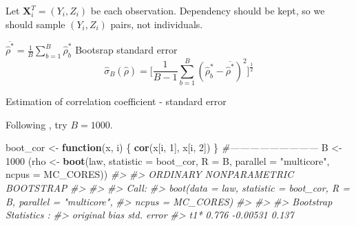 \documentclass[]{book}
\newenvironment{Shaded}{\begin{snugshade}}{\end{snugshade}}
\newcommand{\CommentTok}[1]{\textcolor[rgb]{0.56,0.35,0.01}{\textit{#1}}}
\newcommand{\ControlFlowTok}[1]{\textcolor[rgb]{0.13,0.29,0.53}{\textbf{#1}}}
\newcommand{\DataTypeTok}[1]{\textcolor[rgb]{0.13,0.29,0.53}{#1}}
\newcommand{\DecValTok}[1]{\textcolor[rgb]{0.00,0.00,0.81}{#1}}
\newcommand{\KeywordTok}[1]{\textcolor[rgb]{0.13,0.29,0.53}{\textbf{#1}}}
\newcommand{\NormalTok}[1]{#1}
\newcommand{\StringTok}[1]{\textcolor[rgb]{0.31,0.60,0.02}{#1}}
\theoremstyle{definition}
\theoremstyle{definition}
\theoremstyle{definition}
\theoremstyle{remark}
\begin{document}
Let \(\mathbf{X}_i^T = (Y_i, Z_i)\) be each observation. Dependency should be kept, so we should sample \((Y_i, Z_i)\) pairs, not individuals.

\begin{algorithm}[H] \label{alg:algbootcor}
  \SetAlgoLined
  $\overline{\hat\rho^{\ast}} = \frac{1}{B} \sum\limits_{b = 1}^B \hat\rho_b^{\ast}$\;
  Bootsrap standard error $$\hat\sigma_B (\hat\rho) = \bigg[ \frac{1}{B - 1} \sum_{b = 1}^B (\hat\rho_b^{\ast} - \overline{\hat\rho^{\ast}})^2 \bigg]^{\frac{1}{2}}$$\; \label{alg:seout}
  \caption{Estimation of correlation coefficient - standard error}
\end{algorithm}

Following \citet{Efron:1983bw}, try \(B = 1000\).

\begin{Shaded}
\begin{Highlighting}[]
\NormalTok{boot_cor <-}\StringTok{ }\ControlFlowTok{function}\NormalTok{(x, i) \{}
  \KeywordTok{cor}\NormalTok{(x[i, }\DecValTok{1}\NormalTok{], x[i, }\DecValTok{2}\NormalTok{])}
\NormalTok{\}}
\CommentTok{#---------------------------}
\NormalTok{B <-}\StringTok{ }\DecValTok{1000}
\NormalTok{(rho <-}\StringTok{ }\KeywordTok{boot}\NormalTok{(law, }\DataTypeTok{statistic =}\NormalTok{ boot_cor, }\DataTypeTok{R =}\NormalTok{ B, }
            \DataTypeTok{parallel =} \StringTok{"multicore"}\NormalTok{, }\DataTypeTok{ncpus =}\NormalTok{ MC_CORES))}
\CommentTok{#> }
\CommentTok{#> ORDINARY NONPARAMETRIC BOOTSTRAP}
\CommentTok{#> }
\CommentTok{#> }
\CommentTok{#> Call:}
\CommentTok{#> boot(data = law, statistic = boot_cor, R = B, parallel = "multicore", }
\CommentTok{#>     ncpus = MC_CORES)}
\CommentTok{#> }
\CommentTok{#> }
\CommentTok{#> Bootstrap Statistics :}
\CommentTok{#>     original   bias    std. error}
\CommentTok{#> t1*    0.776 -0.00531       0.137}
\end{Highlighting}
\end{Shaded}
\end{document}
